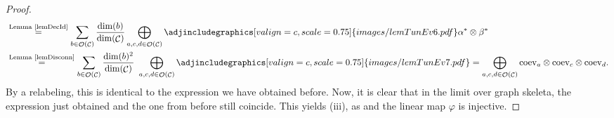 \documentclass[pdftex]{sigma}
\DeclareMathOperator{\K}{\mathbb{K}}
\DeclareMathOperator{\calc}{\mathcal{C}}
\DeclareMathOperator{\calo}{\mathcal{O}}
\numberwithin{equation}{section}
\theoremstyle{definition}
\begin{document}
\begin{proof}
\begin{align*}
 &\overset{\text{Lemma~\ref{lemDecId}}}{=} \sum_{b \in \calo(\calc)} \frac{\dim(b)}{\dim(\calc)}\bigoplus_{a,c,d \in \calo(\calc)} \adjincludegraphics[valign=c, scale = 0.75]{images/lemTunEv6.pdf} \alpha^* \otimes \beta^*\\
 &\overset{\text{Lemma~\ref{lemDisconn}}}{=} \sum_{b \in \calo(\calc)} \frac{\dim(b)^2}{\dim(\calc)} \, \, \bigoplus_{a, c, d \in \calo(\calc)} \adjincludegraphics[valign=c, scale = 0.75]{images/lemTunEv7.pdf}= \bigoplus_{a, c, d \in \calo(\calc)} \mathrm{coev}_a \otimes \mathrm{coev}_c \otimes \mathrm{coev}_d.
 \end{align*}
 By a relabeling, this is identical to the expression we have obtained before. Now, it is clear that in the limit over graph skeleta, the expression just obtained and the one from before still coincide. This yields (iii), as \smash{$\varphi([x]) = \tau_x = |\overline{\mathbb{T}_x^s} |_{\mathcal{C}}(1_{\K})$} and the linear map $\varphi$ is injective.


\end{proof}
\end{document}
